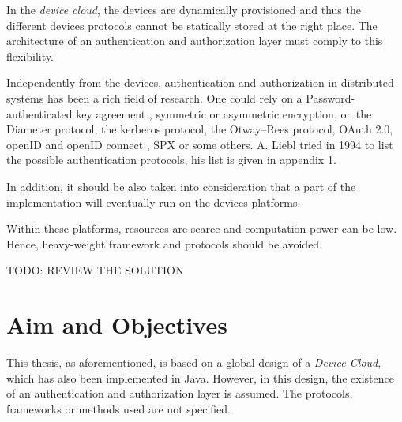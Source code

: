 In the \emph{device cloud}, the devices are dynamically provisioned and thus the different devices protocols cannot be statically stored at the right place. The architecture of an authentication and authorization layer must comply to this flexibility.

Independently from the devices, authentication and authorization in distributed systems has been a rich field of research. One could rely on a Password-authenticated key agreement \cite{Hao2011}\cite{Pointcheval2012}\cite{Juang2008}, symmetric or asymmetric encryption\cite{Denning1982}, on the Diameter protocol, the kerberos protocol\cite{neuman2005kerberos}, the Otway–Rees protocol, OAuth 2.0\cite{hardt2012oauth}, openID\cite{Ghazizadeh} and openID connect \cite{sakimura2014openid}, SPX\cite{Tardo1991} or some others. A. Liebl tried in 1994 to list the possible authentication protocols, his list is given in appendix 1\cite{Liebl1993}.

In addition, it should be also taken into consideration that a part of the implementation will eventually run on the devices platforms. 

Within these platforms, resources are scarce and computation power can be low. Hence, heavy-weight framework and protocols should be avoided.

{ \huge TODO: REVIEW THE SOLUTION }






\section{Aim and Objectives}
This thesis, as aforementioned, is based on a global design of a \emph{Device Cloud}, which has also been implemented in Java. However, in this design, the existence of an authentication and authorization layer is assumed. The protocols, frameworks or methods used are not specified.

